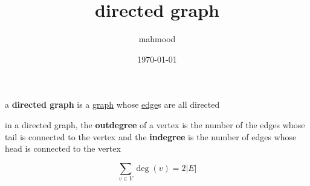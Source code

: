 \documentclass[a4paper,12pt]{article}
\author{mahmood}
\date{\today}
\title{directed graph}
\begin{document}
\maketitle
\begin{definition}
a \textbf{directed graph} is a \href{20230314001051-graph.org}{graph} whose \href{20230314001632-edge.org}{edge}s are all directed\\
\end{definition}
\begin{definition}
in a directed graph, the \textbf{outdegree} of a vertex is the number of the edges whose tail is connected to the vertex and the \textbf{indegree} is the number of edges whose head is connected to the vertex\\
\end{definition}
\begin{lemma}
\[
\sum_{v \in V} \deg(v) = 2|E|
\]\\
\end{lemma}
\end{document}
